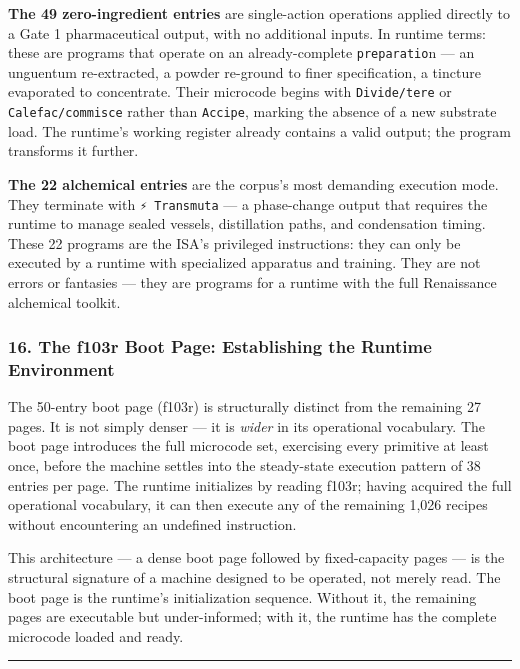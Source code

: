 \textbf{The 49 zero-ingredient entries} are single-action operations
applied directly to a Gate 1 pharmaceutical output, with no additional
inputs. In runtime terms: these are programs that operate on an
already-complete \texttt{preparatio}n --- an unguentum re-extracted, a
powder re-ground to finer specification, a tincture evaporated to
concentrate. Their microcode begins with \texttt{Divide/tere} or
\texttt{Calefac/commisce} rather than \texttt{Accipe}, marking the
absence of a new substrate load. The runtime's working register already
contains a valid output; the program transforms it further.

\textbf{The 22 alchemical entries} are the corpus's most demanding
execution mode. They terminate with \texttt{⚡\ Transmuta} --- a
phase-change output that requires the runtime to manage sealed vessels,
distillation paths, and condensation timing. These 22 programs are the
ISA's privileged instructions: they can only be executed by a runtime
with specialized apparatus and training. They are not errors or
fantasies --- they are programs for a runtime with the full Renaissance
alchemical toolkit.

\hypertarget{the-f103r-boot-page-establishing-the-runtime-environment}{%
\subsubsection{16. The f103r Boot Page: Establishing the Runtime
Environment}\label{the-f103r-boot-page-establishing-the-runtime-environment}}

The 50-entry boot page (f103r) is structurally distinct from the
remaining 27 pages. It is not simply denser --- it is \emph{wider} in
its operational vocabulary. The boot page introduces the full microcode
set, exercising every primitive at least once, before the machine
settles into the steady-state execution pattern of 38 entries per page.
The runtime initializes by reading f103r; having acquired the full
operational vocabulary, it can then execute any of the remaining 1,026
recipes without encountering an undefined instruction.

This architecture --- a dense boot page followed by fixed-capacity pages
--- is the structural signature of a machine designed to be operated,
not merely read. The boot page is the runtime's initialization sequence.
Without it, the remaining pages are executable but under-informed; with
it, the runtime has the complete microcode loaded and ready.

\begin{center}\rule{0.5\linewidth}{0.5pt}\end{center}

